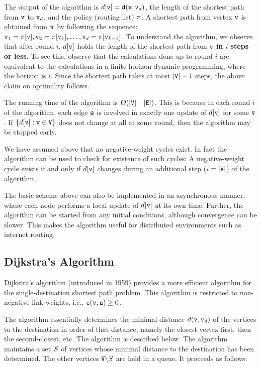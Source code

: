 The output of the algorithm is $d[{\tt v}] = {\tt d}({\tt v},{\tt v}_d)$, the length of the shortest path from ${\tt v}$ to ${\tt v}_d$, and the policy (routing list) $\pi$. A shortest path from vertex ${\tt v}$ is obtained from $\pi $ by following the sequence: ${{\tt v}_1} = \pi [{\tt v}], {{\tt v}_2} = \pi [{{\tt v}_1}],  \ldots ,{\tt v}_d = \pi [{{\tt v}_{k - 1}}]$.
To understand the algorithm, we observe that after round $i$, $d[{\tt v}]$ holds the length of the shortest path from ${\tt v}$ \textbf{in $i$ steps or less}. To see this, observe that the calculations done up to round $i$ are equivalent to the calculations in a finite horizon dynamic programming, where the horizon is $i$. Since the shortest path takes at most $|{\tt V}| - 1$ steps, the above claim on optimality follows.

The running time of the algorithm is $O(|{\tt V}|\, \cdot \,|{\tt E}|)$. This is because in each round $i$ of the algorithm, each edge ${\tt e}$ is involved in exactly one update of $d[{\tt v}]$ for some ${\tt v}$. If $\{ d[{\tt v}]:{\tt v} \in {\tt V}\}$ does not change at all at some round, then the algorithm may be stopped early.

\begin{remark}
    We have assumed above that no negative-weight cycles exist. In fact the algorithm can be used to check for existence of such cycles: A negative-weight cycle exists if and only if  $d[{\tt v}]$ changes during an additional step ($i = |{\tt V}|$) of the algorithm.
\end{remark}
\begin{remark}
    The basic scheme above can also be implemented in an asynchronous manner, where each node performs a local update of $d[{\tt v}]$ at its own time. Further, the algorithm can be started from any initial conditions, although convergence can be slower. This makes the algorithm useful for distributed environments such as internet routing.
\end{remark}

\subsection{Dijkstra's Algorithm}
Dijkstra's algorithm (introduced in 1959) provides a more efficient algorithm for the single-destination shortest path problem. This algorithm is restricted to non-negative link weights, i.e., ${\tt c}({\tt v},{\tt u}) \ge 0$.

The algorithm essentially determines the minimal distance $d({\tt v},{\tt v}_d)$ of the vertices to the destination in order of that distance, namely the closest vertex first, then the second-closest, etc.  The algorithm is 
described below.
The algorithm maintains a set ${S}$ of vertices whose minimal distance to the destination has been determined. The other vertices ${\tt V}\backslash {S}$ are held in a queue. It proceeds as follows.

